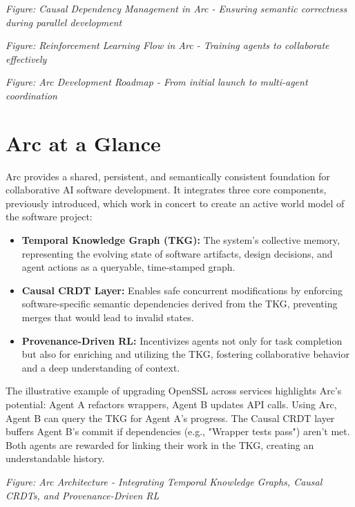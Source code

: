 \documentclass{article}
\begin{document}

\begin{center}
\textit{Figure: Causal Dependency Management in Arc - Ensuring semantic correctness during parallel development}
\end{center}


\begin{center}
\textit{Figure: Reinforcement Learning Flow in Arc - Training agents to collaborate effectively}
\end{center}


\begin{center}
\textit{Figure: Arc Development Roadmap - From initial launch to multi-agent coordination}
\end{center}

\section{Arc at a Glance}
Arc provides a shared, persistent, and semantically consistent foundation for collaborative AI software development. It integrates three core components, previously introduced, which work in concert to create an active world model of the software project:
\begin{itemize}
    \item \textbf{Temporal Knowledge Graph (TKG):} The system's collective memory, representing the evolving state of software artifacts, design decisions, and agent actions as a queryable, time-stamped graph.
    \item \textbf{Causal CRDT Layer:} Enables safe concurrent modifications by enforcing software-specific semantic dependencies derived from the TKG, preventing merges that would lead to invalid states.
    \item \textbf{Provenance-Driven RL:} Incentivizes agents not only for task completion but also for enriching and utilizing the TKG, fostering collaborative behavior and a deep understanding of context.
\end{itemize}
The illustrative example of upgrading OpenSSL across services highlights Arc's potential: Agent A refactors wrappers, Agent B updates API calls. Using Arc, Agent B can query the TKG for Agent A's progress. The Causal CRDT layer buffers Agent B's commit if dependencies (e.g., "Wrapper tests pass") aren't met. Both agents are rewarded for linking their work in the TKG, creating an understandable history.


\begin{center}
\textit{Figure: Arc Architecture - Integrating Temporal Knowledge Graphs, Causal CRDTs, and Provenance-Driven RL}
\end{center}
\end{document}
